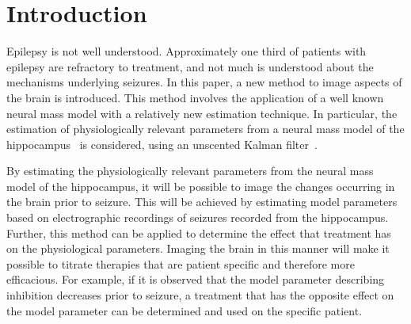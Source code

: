 \section{Introduction}


Epilepsy is not well understood. Approximately one third of patients with epilepsy are refractory to treatment, and not much is understood about the mechanisms underlying seizures. In this paper, a new method to image aspects of the brain is introduced. This method involves the application of a well known neural mass model with a relatively new estimation technique. In particular, the estimation of physiologically relevant parameters from a neural mass model of the hippocampus~\citep{wendling2002epileptic} is considered, using an unscented Kalman filter~\citep{voss2004nonlinear}. 

By estimating the physiologically relevant parameters from the neural mass model of the hippocampus, it will be possible to image the changes occurring in the brain prior to seizure. This will be achieved by estimating model parameters based on electrographic recordings of seizures recorded from the hippocampus. Further, this method can be applied to determine the effect that treatment has on the physiological parameters. Imaging the brain in this manner will make it possible to titrate therapies that are patient specific and therefore more efficacious. For example, if it is observed that the model parameter describing inhibition decreases prior to seizure, a treatment that has the opposite effect on the model parameter can be determined and used on the specific patient.


